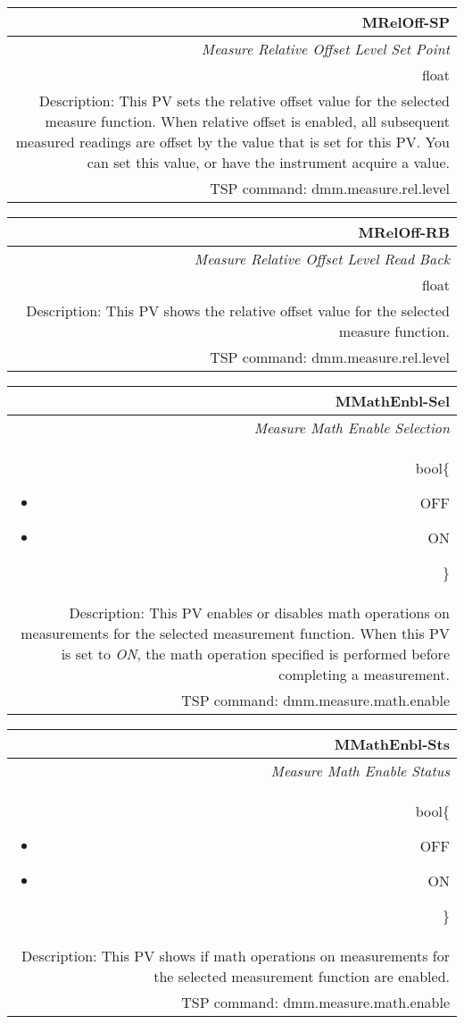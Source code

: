 \documentclass[openany]{article}
\begin{document}
		\begin{tabular}{N}
			\hline
			\bfseries MRelOff-SP\label{pv:mreloff-sp} \\ \hline
			\emph{Measure Relative Offset Level Set Point} \\
			float \\
			Description: This PV sets the relative offset value for the selected measure function. When relative offset is enabled, all subsequent measured readings are offset by the value that is set for this PV. You can set this value, or have the instrument acquire a value. \\
			TSP command: dmm.measure.rel.level
		\end{tabular}

		\begin{tabular}{N}
			\hline
			\bfseries MRelOff-RB\label{pv:mreloff-rb} \\ \hline
			\emph{Measure Relative Offset Level Read Back} \\
			float \\
			Description: This PV shows the relative offset value for the selected measure function. \\
			TSP command: dmm.measure.rel.level
		\end{tabular}

		\begin{tabular}{N}
			\hline
			\bfseries MMathEnbl-Sel\label{pv:mmathenbl-sel} \\ \hline
			\emph{Measure Math Enable Selection} \\
			bool\{\begin{itemize}[noitemsep]
				\small
				\item[] OFF
				\item[] ON
			\end{itemize}\} \\
			Description: This PV enables or disables math operations on measurements for the selected measurement function. When this PV is set to \emph{ON}, the math operation specified is performed before completing a measurement. \\
			TSP command: dmm.measure.math.enable
		\end{tabular}

		\begin{tabular}{N}
			\hline
			\bfseries MMathEnbl-Sts\label{pv:mmathenbl-sts} \\ \hline
			\emph{Measure Math Enable Status} \\
			bool\{\begin{itemize}[noitemsep]
				\small
				\item[] OFF
				\item[] ON
			\end{itemize}\} \\
			Description: This PV shows if math operations on measurements for the selected measurement function are enabled. \\
			TSP command: dmm.measure.math.enable
		\end{tabular}
\end{document}

